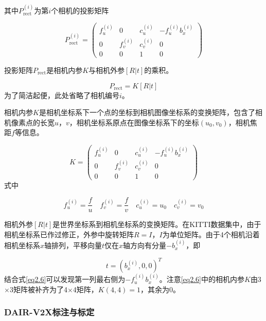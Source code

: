 其中$P_{\text{rect}}^{(i)}$为第$i$个相机的投影矩阵

\begin{equation}
    {P}_{\text {rect }}^{(i)}=
    \left(\begin{array}{cccc}
        f_{u}^{(i)} & 0 & c_{u}^{(i)} & -f_{u}^{(i)} b_{x}^{(i)} \\
        0 & f_{v}^{(i)} & c_{v}^{(i)} & 0 \\
        0 & 0 & 1 & 0
    \end{array}\right)
\end{equation}

投影矩阵${P}_{\text{rect}}$是相机内参$K$与相机外参$[R|t]$的乘积。

\begin{equation}
    {P}_{\text{rect}} = K[R|t]
    \label{eq2.6}
\end{equation}
为了简洁起便，此处省略了相机编号$i$。 

相机内参$K$是相机坐标系下一个点的坐标到相机图像坐标系的变换矩阵，包含了相机像素点的长宽$u$，$v$，相机坐标系原点在图像坐标系下的坐标$(u_0,v_0)$，相机焦距$f$等信息。

\begin{equation}
    K = 
    \left(\begin{array}{cccc}
        f_{u}^{(i)} & 0 & c_{u}^{(i)} & -f_{u}^{(i)} b_{x}^{(i)} \\
        0 & f_{v}^{(i)} & c_{v}^{(i)} & 0 \\
        0 & 0 & 1 & 0
    \end{array}\right)
\end{equation}
式中

\begin{equation}
    f_{u}^{(i)} = \frac{f}{u}\quad
    f_{v}^{(i)} = \frac{f}{v}\quad
    c_{u}^{(i)} = u_0\quad
    c_{v}^{(i)} = v_0
\end{equation}

相机外参$[R|t]$是世界坐标系到相机坐标系的变换矩阵。在KITTI数据集中，由于相机坐标系已作过修正，外参中旋转矩阵$R=I$，$I$为单位矩阵。由于4个相机沿着相机坐标系$x$轴排列，平移向量$t$仅在$x$轴方向有分量$-b_x^{(i)}$，即

\begin{equation}
    t=(b_x^{(i)},0,0)^T
\end{equation}
结合式\eqref{eq2.6}可以发现第一列最右侧为$-f_{u}^{(i)} b_{x}^{(i)}$。注意\eqref{eq2.6}中的相机内参$K$由3$\times$3矩阵被补齐为了4$\times$4矩阵，$K(4,4)=1$，其余为0。

\subsubsection{DAIR-V2X标注与标定}

